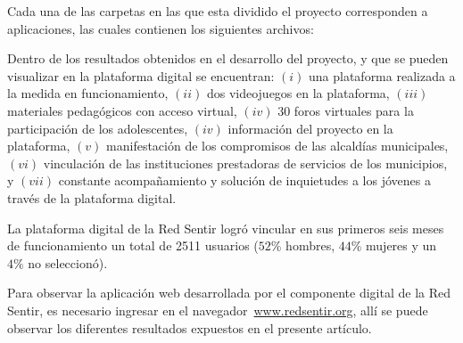 \documentclass[journal,transmag]{IEEEtran}
\begin{document}
Cada una de las carpetas en las que esta dividido el proyecto corresponden a aplicaciones, las cuales contienen los siguientes archivos:

\vspace{4mm}
\vspace{4mm}

Dentro de los resultados obtenidos en el desarrollo del proyecto, y que se pueden visualizar en la plataforma digital se encuentran: $(i)$ una plataforma realizada a la medida en funcionamiento, $(ii)$ dos videojuegos en la plataforma, $(iii)$ materiales pedagógicos con acceso virtual, $(iv)$ $30$ foros virtuales para la participación de los adolescentes, $(iv)$ información del proyecto en la plataforma, $(v)$ manifestación de los compromisos de las alcaldías municipales, $(vi)$ vinculación de las instituciones prestadoras de servicios de los municipios, y $(vii)$ constante acompañamiento y solución de inquietudes a los jóvenes a través de la plataforma digital.

La plataforma digital de la Red Sentir logró vincular en sus primeros seis meses de funcionamiento un total de 2511 usuarios ($52\%$ hombres, $44\%$ mujeres y un $4\%$ no seleccionó).

Para observar la aplicación web desarrollada por el componente digital de la Red Sentir, es necesario ingresar en el navegador~\url{www.redsentir.org}, allí se puede observar los diferentes resultados expuestos en el presente artículo.
\end{document}
